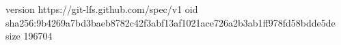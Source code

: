 version https://git-lfs.github.com/spec/v1
oid sha256:9b4269a7bd3baeb8782c42f3abf13af1021ace726a2b3ab1ff978fd58bdde5de
size 196704

